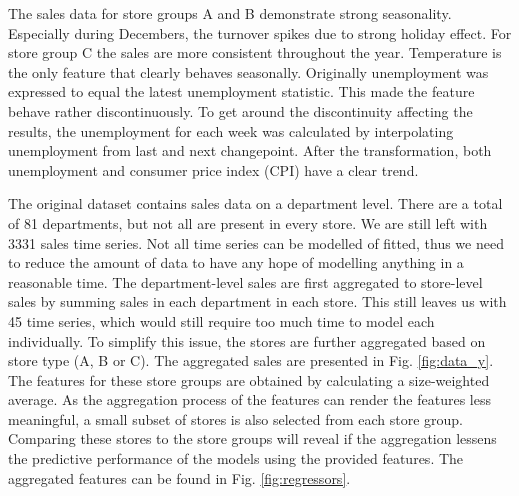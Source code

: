 \documentclass[english, 12pt, a4paper, sci, utf8, a-1b, online]{aaltothesis}
\begin{document}
The sales data for store groups A and B demonstrate strong seasonality. Especially during Decembers, the turnover spikes due to strong holiday effect. For store group C the sales are more consistent throughout the year. Temperature is the only feature that clearly behaves seasonally. Originally unemployment was expressed to equal the latest unemployment statistic. This made the feature behave rather discontinuously. To get around the discontinuity affecting the results, the unemployment for each week was calculated by interpolating unemployment from last and next changepoint. After the transformation, both unemployment and consumer price index (CPI) have a clear trend. 



The original dataset contains sales data on a department level. There are a total of 81 departments, but not all are present in every store. We are still left with 3331 sales time series. Not all time series can be modelled of fitted, thus we need to reduce the amount of data to have any hope of modelling anything in a reasonable time. The department-level sales are first aggregated to store-level sales by summing sales in each department in each store. This still leaves us with 45 time series, which would still require too much time to model each individually. To simplify this issue, the stores are further aggregated based on store type (A, B or C). The aggregated sales are presented in Fig. \ref{fig:data_y}. The features for these store groups are obtained by calculating a size-weighted average. As the aggregation process of the features can render the features less meaningful, a small subset of stores is also selected from each store group. Comparing these stores to the store groups will reveal if the aggregation lessens the predictive performance of the models using the provided features. The aggregated features can be found in Fig. \ref{fig:regressors}.
\end{document}
